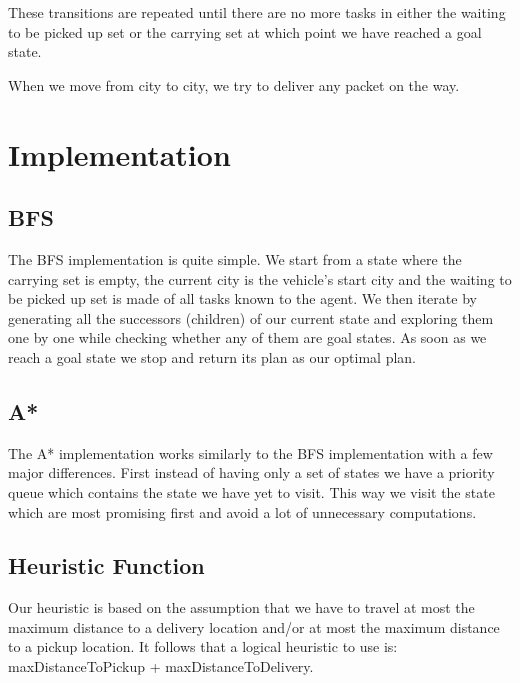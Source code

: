\documentclass[11pt]{article}
\begin{document}
These transitions are repeated until there are no more tasks in either
the waiting to be picked up set or the carrying set at which point we
have reached a goal state.

When we move from city to city, we try to deliver any packet on the way.

\section{Implementation}

\subsection{BFS}


The BFS implementation is quite simple. We start from a state where
the carrying set is empty, the current city is the vehicle's start
city and the waiting to be picked up set is made of all tasks known to
the agent. We then iterate by generating all the successors (children)
of our current state and exploring them one by one while checking
whether any of them are goal states. As soon as we reach a goal state
we stop and return its plan as our optimal plan.

\subsection{A*}
The A* implementation works similarly to the BFS implementation with a
few major differences. First instead of having only a set of states
we have a priority queue which contains the state we have yet to
visit. This way we visit the state which are most promising first and
avoid a lot of unnecessary computations.

\subsection{Heuristic Function}


Our heuristic is based on the assumption that we have to travel at
most the maximum distance to a delivery location and/or at most the
maximum distance to a pickup location. It follows that a logical
heuristic to use is: maxDistanceToPickup + maxDistanceToDelivery.
\end{document}
